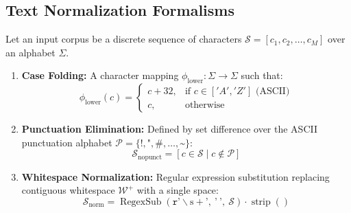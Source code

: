 \subsection{Text Normalization Formalisms}
Let an input corpus be a discrete sequence of characters $\mathcal{S} = [c_1, c_2, \dots, c_M]$ over an alphabet $\Sigma$.
\begin{enumerate}
    \item \textbf{Case Folding:} A character mapping $\phi_{\text{lower}}: \Sigma \to \Sigma$ such that:
    \begin{equation}
        \phi_{\text{lower}}(c) = \begin{cases} c + 32, & \text{if } c \in ['A', 'Z'] \text{ (ASCII)} \\ c, & \text{otherwise} \end{cases}
    \end{equation}
    \item \textbf{Punctuation Elimination:} Defined by set difference over the ASCII punctuation alphabet $\mathcal{P} = \{\texttt{!}, \texttt{"}, \texttt{\#}, \dots, \texttt{\textasciitilde}\}$:
    \begin{equation}
        \mathcal{S}_{\text{nopunct}} = [c \in \mathcal{S} \mid c \notin \mathcal{P}]
    \end{equation}
    \item \textbf{Whitespace Normalization:} Regular expression substitution replacing contiguous whitespace $\mathcal{W}^+$ with a single space:
    \begin{equation}
        \mathcal{S}_{\text{norm}} = \operatorname{RegexSub}(\texttt{r}\text{'}\backslash\text{s}+\text{'},\ \text{'}\ \text{'},\ \mathcal{S})\cdot\operatorname{strip}()
    \end{equation}
\end{enumerate}

